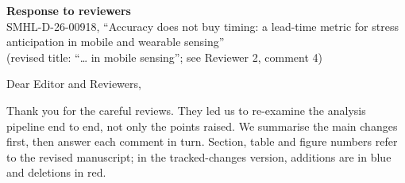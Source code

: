 \documentclass[11pt]{article}
\begin{document}
\begin{center}
{\large\bfseries Response to reviewers}\\[2pt]
SMHL-D-26-00918, ``Accuracy does not buy timing: a lead-time metric for
stress anticipation in mobile and wearable sensing''\\[2pt]
(revised title: ``\ldots{} in mobile sensing''; see Reviewer 2, comment 4)
\end{center}

Dear Editor and Reviewers,

Thank you for the careful reviews. They led us to re-examine the
analysis pipeline end to end, not only the points raised. We summarise
the main changes first, then answer each comment in turn. Section, table and figure numbers refer to the revised manuscript;
in the tracked-changes version, additions are in blue and deletions in
red.
\end{document}
